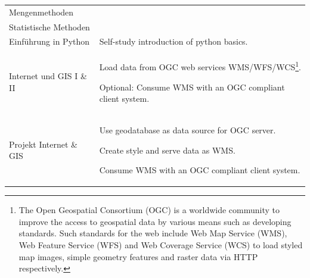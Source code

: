 \documentclass[11pt, a4paper, oneside, parskip=full-]{scrartcl}
\begin{document}
\begin{table}[!htbp]
\begin{tabularx}{\textwidth}{lX}
    \cmidrule(r){1-1} Mengenmethoden &  \\
    \cmidrule(r){1-1} Statistische Methoden &  \\
    \midrule
    Einführung in Python & Self-study introduction of python basics. \\
    \midrule
    Internet und GIS I \& II &
      \begin{itemize}[left=0pt,nosep,before={\begin{minipage}[t]{\hsize}},after
      ={\end{minipage}}]
      \item Load data from OGC web services WMS/WFS/WCS\footnote{The Open
      Geospatial Consortium (OGC) is a worldwide community to improve the access
      to geospatial data by various means such as developing standards. Such
      standards for the web include Web Map Service (WMS), Web Feature Service
      (WFS) and Web Coverage Service (WCS) to load styled map images, simple
      geometry features and raster data via HTTP respectively.}.
      \item Optional: Consume WMS with an OGC compliant client system.
      \end{itemize}\nointerlineskip \\
    \midrule
    Projekt Internet \& GIS &
      \begin{itemize}[left=0pt,nosep,before={\begin{minipage}[t]{\hsize}},after
      ={\end{minipage}}]
      \item Use geodatabase as data source for OGC server.
      \item Create style and serve data as WMS.
      \item Consume WMS with an OGC compliant client system.
      \end{itemize}\nointerlineskip \\
    \bottomrule
  \end{tabularx}%
\end{table}%

\end{document}

